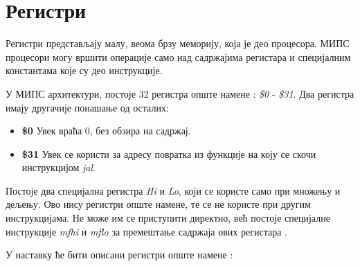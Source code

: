 \documentclass[12pt,oneside]{memoir}
\begin{document}
\section{Регистри}
\label{sec:registers}
Регистри представљају малу, веома брзу меморију, која је део процесора. МИПС процесори могу вршити операције само над садржајима регистара и специјалним константама које су део инструкције.

У МИПС архитектури, постоје 32 регистра опште намене \cite{mips}: \textit{\$0} - \textit{\$31}. Два регистра имају другачије понашање од осталих: 
\begin{itemize}
\item \textbf{\$0} Увек враћа 0, без обзира на садржај.
\item \textbf{\$31} Увек се користи за адресу повратка из функције на коју се скочи инструкцијом \textit{jal}.
\end{itemize}

Постоје два специјална регистра \textit{Hi} и \textit{Lo}, који се користе само при множењу и дељењу. Ово нису регистри опште намене, те се не користе при другим инструкцијама. Не може им се приступити директно, већ постоје специјалне инструкције \textit{mfhi} и \textit{mflo} за премештање садржаја ових регистара \cite{mips}.

У наставку ће бити описани регистри опште намене \cite{mips}:
\end{document}
